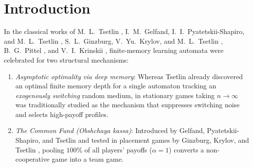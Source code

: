 \documentclass[11pt,reqno]{amsart}
\theoremstyle{definition}
\theoremstyle{remark}
\begin{document}
\begin{abstract}
Third, we introduce \emph{partial} Common Funds ($\alpha \in [0,1]$) in $N$-player threshold public goods with quorum $\theta \in (0,1/2)$ and cost $c$. At depth $n=1$ ($L_{2,2}$ or $B_{2,2}$), we prove a general parametric theorem identifying the unique limiting welfare-maximizing share $A_1 = \frac{c\theta-(1-H)(1-2\theta)}{2c\theta(1-\theta)} \in [0,1)$, attaining the social optimum $H-c\theta$ with finite-$N$ shift $\alpha_N^{\mathrm{opt}}-A_1 = \Theta(\sqrt{\log N/N})$ and optimal deficit $\Theta(\sqrt{\log N/N})$ (vs.\ $\Theta(1/\log N)$ at fixed $A_1$). On the benchmark $(0.80,0.97,0.60,1/4)$, blind depth-$1$ agents attain $0.82$ at $A_1 = 3/5$---strictly below the limiting pivotal Nash share $\alpha_{\mathrm{Nash}} = 43/60$, beating both private ($0.68$) and full pooling ($0.67$). For arbitrary depth $n \ge 1$ ($N\to\infty$ first), the feasible quota-balance shares $A_n$ increase strictly and cross $\alpha_{\mathrm{Nash}}$ at the \emph{exact critical cutoff $n_c = 2$}: $A_1 = 3/5 < 43/60 < A_2 = (11-4\sqrt{3})/5 \approx 0.8144 < A_3 \approx 0.8863$. For every $n \ge 2$ and $\alpha \le 43/60$, no productive fixed point exists and a positive welfare gap persists uniformly in $N$ (with locally attracting period-$3$ limit cycles at $n=2, \alpha=0.70$), while $1 - A_n \sim \frac{p_*(1-p_*)}{cn}\log\frac{1-\theta}{\theta}$. Core algebraic identities, depth-$1$ rational certificates, and the $n_c=2$ cutoff are verified in standalone Lean~4.
\end{abstract}

\maketitle

\section{Introduction}

In the classical works of M.~L.~Tsetlin \cite{Tsetlin1961,Tsetlin1963}, I.~M.~Gelfand, I.~I.~Pyatetskii-Shapiro, and M.~L.~Tsetlin \cite{GPST1963}, S.~L.~Ginzburg, V.~Yu.~Krylov, and M.~L.~Tsetlin \cite{GKT1964}, B.~G.~Pittel \cite{Pittel1965}, and V.~I.~Krinskii \cite{Krinskii1966}, finite-memory learning automata were celebrated for two structural mechanisms:
\begin{enumerate}
  \item \emph{Asymptotic optimality via deep memory}: Whereas Tsetlin \cite{Tsetlin1963} already discovered an optimal finite memory depth for a single automaton tracking an \emph{exogenously switching} random medium, in stationary games taking $n \to \infty$ was traditionally studied as the mechanism that suppresses switching noise and selects high-payoff profiles.
  \item \emph{The Common Fund (\emph{Obshchaya kassa})}: Introduced by Gelfand, Pyatetskii-Shapiro, and Tsetlin \cite{GPST1963} and tested in placement games by Ginzburg, Krylov, and Tsetlin \cite{GKT1964}, pooling $100\%$ of all players' payoffs ($\alpha = 1$) converts a non-cooperative game into a team game.
\end{enumerate}
\end{document}

